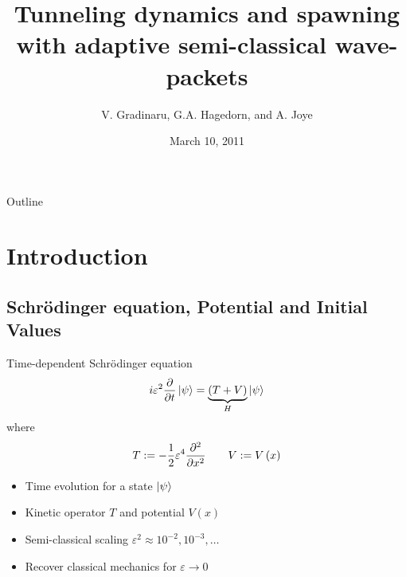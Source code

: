 \documentclass{beamer}
\title[Tunneling dynamics and spawning]{Tunneling dynamics and spawning with adaptive semi-classical wave-packets}
\author[]{V. Gradinaru, G.A. Hagedorn, and A. Joye}
\date{March 10, 2011}
\begin{document}
\begin{frame}
  \titlepage
\end{frame}


\begin{frame}{Outline}
  \tableofcontents
\end{frame}


\section{Introduction}
\subsection{Schrödinger equation, Potential and Initial Values}


\begin{frame}{Time-dependent Schrödinger equation}
  \begin{equation*} \label{eq:basics_tdse_semi}
    i \varepsilon^2 \frac{\partial}{\partial t} \Ket{\psi} = \underbrace{\left(T+V\right)}_{H} \Ket{\psi}
  \end{equation*}
  where
  \begin{equation*}
    T := - \frac{1}{2} \varepsilon^4 \frac{\partial^2}{\partial x^2} \qquad
    V := V\left( x \right)
  \end{equation*}
  \begin{itemize}
    \item Time evolution for a state $\Ket{\psi}$
    \item Kinetic operator $T$ and potential $V\left( x \right)$
    \item Semi-classical scaling $\varepsilon^2 \approx 10^{-2}, 10^{-3}, \ldots$
    \item Recover classical mechanics for $\varepsilon \rightarrow 0$
  \end{itemize}
\end{frame}
\end{document}
